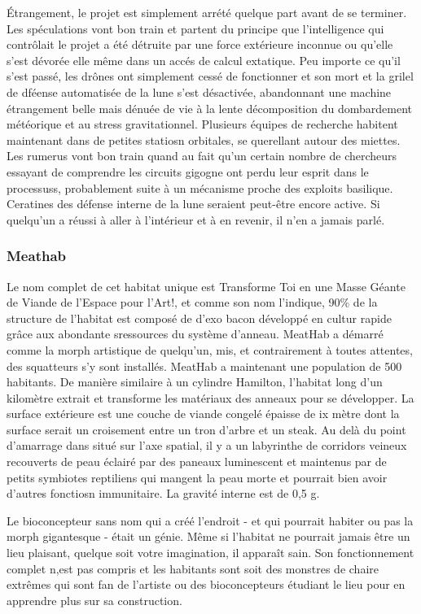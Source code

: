 Étrangement, le projet est simplement arrété quelque part avant de se terminer. Les spéculations vont bon train et partent du principe que l'intelligence qui contrôlait le projet a été détruite par une force extérieure inconnue ou qu'elle s'est dévorée elle même dans un accés de calcul extatique. Peu importe ce qu'il s'est passé, les drônes ont simplement cessé de fonctionner et son mort et la grilel de dféense automatisée de la lune s'est désactivée, abandonnant une machine étrangement belle mais dénuée de vie à la lente décomposition du dombardement météorique et au stress gravitationnel. Plusieurs équipes de recherche habitent maintenant dans de petites statiosn orbitales, se querellant autour des miettes. Les rumerus vont bon train quand au fait qu'un certain nombre de chercheurs essayant de comprendre les circuits gigogne ont perdu leur esprit dans le processuss, probablement suite à un mécanisme proche des exploits basilique. Ceratines des défense interne de la lune seraient peut-être encore active. Si quelqu'un a réussi à aller à l'intérieur et à en revenir, il n'en a jamais parlé. 

\subsubsection{Meathab} \label{sec:meathab} 

Le nom complet de cet habitat unique est Transforme Toi en une Masse Géante de Viande de l'Espace pour l'Art!, et comme son nom l'indique, 90\% de la structure de l'habitat est composé de d'exo bacon développé en cultur rapide grâce aux abondante sressources du système d'anneau. MeatHab a démarré comme la morph artistique de quelqu'un, mis, et contrairement à toutes attentes, des squatteurs s'y sont installés. MeatHab a maintenant une population de 500 habitants. De manière similaire à un cylindre Hamilton, l'habitat long d'un kilomètre extrait et transforme les matériaux des anneaux pour se développer. La surface extérieure est une couche de viande congelé épaisse de ix mètre dont la surface serait un croisement entre un tron d'arbre et un steak. Au delà du point d'amarrage dans situé sur l'axe spatial, il y a un labyrinthe de corridors veineux recouverts de peau éclairé par des paneaux luminescent et maintenus par de petits symbiotes reptiliens qui mangent la peau morte et pourrait bien avoir d'autres fonctiosn immunitaire. La gravité interne est de 0,5 g. 

Le bioconcepteur sans nom qui a créé l'endroit - et qui pourrait habiter ou pas la morph gigantesque - était un génie. Même si l'habitat ne pourrait jamais être un lieu plaisant, quelque soit votre imagination, il apparaît sain. Son fonctionnement complet n,est pas compris et les habitants sont soit des monstres de chaire extrêmes qui sont fan de l'artiste ou des bioconcepteurs étudiant le lieu pour en apprendre plus sur sa construction. 

